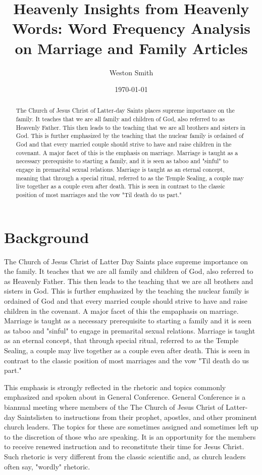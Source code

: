 \documentclass[twocolumn]{article}
\title{Heavenly Insights from Heavenly Words: Word Frequency Analysis on Marriage and Family Articles}
\author[1]{Weston Smith}
\affil{wms29@byu.edu}
\date{\today}
\begin{document}
\newcommand{\church}{The Church of Jesus Christ of Latter-day Saints}

\maketitle

\begin{abstract}
    The Church of Jesus Christ of Latter-day Saints places supreme importance on the family. It teaches that we are all family and children of God, also referred to as Heavenly Father. This then leads to the teaching that we are all brothers and sisters in God. This is further emphasized by the teaching that the nuclear family is ordained of God and that every married couple should strive to have and raise children in the covenant. A major facet of this is the emphasis on marriage. Marriage is taught as a necessary prerequisite to starting a family, and it is seen as taboo and "sinful" to engage in premarital sexual relations. Marriage is taught as an eternal concept, meaning that through a special ritual, referred to as the Temple Sealing, a couple may live together as a couple even after death. This is seen in contrast to the classic position of most marriages and the vow "Til death do us part."

\end{abstract}

\section{Background}
The Church of Jesus Christ of Latter Day Saints place supreme importance on the family. It teaches that we are all family and children of God, also referred to as Heavenly Father. This then leads to the teaching that we are all brothers and sisters in God. This is further emphasized by the teaching the nuclear family is ordained of God and that every married couple should strive to have and raise children in the covenant. A major facet of this the empaphasis on marriage. Marriage is taught as a necessary prerequisite to starting a family and it is seen as taboo and "sinful" to engage in premarital sexual relations. Marriage is taught as an eternal concept, that through special ritual, referred to as the Temple Sealing, a couple may live together as a couple even after death. This is seen in contrast to the classic position of most marriages and the vow "Til death do us part."

This emphasis is strongly reflected in the rhetoric and topics commonly emphasized and spoken about in General Conference. General Conference is a biannual meeting where members of the \church listen to instructions from their prophet, apostles, and other prominent church leaders. The topics for these are sometimes assigned and sometimes left up to the discretion of those who are speaking. It is an opportunity for the members to receive renewed instruction and to reconstitute their time for Jesus Christ. Such rhetoric is very different from the classic scientific and, as church leaders often say, "wordly" rhetoric.
\end{document}
